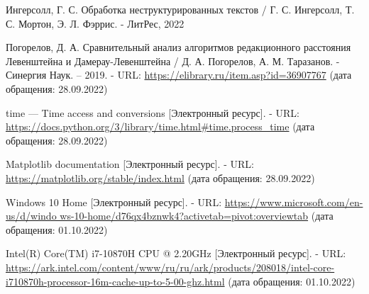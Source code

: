 
\renewcommand\bibname{Список использованной литературы}
\begin{thebibliography}{}
 Ингерсолл, Г. С. Обработка неструктурированных текстов / Г. С. Ингерсолл, Т. С. Мортон, Э. Л. Фэррис. - ЛитРес, 2022

 Погорелов, Д. А. Сравнительный анализ алгоритмов редакционного расстояния Левенштейна и Дамерау-Левенштейна / Д. А. Погорелов, А. М. Таразанов. - Синергия Наук. – 2019. - URL: \url{https://elibrary.ru/item.asp?id=36907767} (дата обращения: 28.09.2022)

 time — Time access and conversions [Электронный ресурс]. - URL: \url{https://docs.python.org/3/library/time.html#time.process_time} (дата обращения: 28.09.2022)

 Matplotlib documentation [Электронный ресурс]. - URL: \url{https://matplotlib.org/stable/index.html} (дата обращения: 28.09.2022)

 Windows 10 Home [Электронный ресурс]. - URL: \url{https://www.microsoft.com/en-us/d/windo ws-10-home/d76qx4bznwk4?activetab=pivot:overviewtab} (дата обращения: 01.10.2022)

 Intel(R) Core(TM) i7-10870H CPU @ 2.20GHz [Электронный ресурс]. - URL: \url{https://ark.intel.com/content/www/ru/ru/ark/products/208018/intel-core-i710870h-processor-16m-cache-up-to-5-00-ghz.html} (дата обращения: 01.10.2022)

\end{thebibliography}